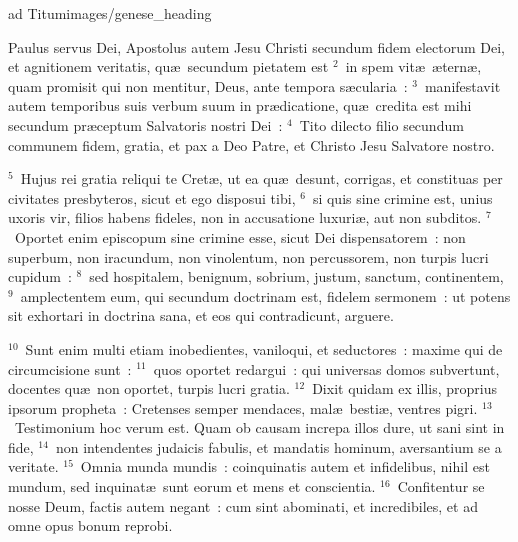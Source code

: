 {ad Titum}{images/genese_heading}


\lettrine[lines=10,image=true,loversize=0.05,lraise=-0.03]{P}{}aulus servus Dei, Apostolus autem Jesu Christi secundum fidem electorum Dei, et agnitionem veritatis, qu\ae\ secundum pietatem est
${}^{2}$~in spem vit\ae\ \ae tern\ae , quam promisit qui non mentitur, Deus, ante tempora s\ae cularia~:
${}^{3}$~manifestavit autem temporibus suis verbum suum in pr\ae dicatione, qu\ae\ credita est mihi secundum pr\ae ceptum Salvatoris nostri Dei~:
${}^{4}$~Tito dilecto filio secundum communem fidem, gratia, et pax a Deo Patre, et Christo Jesu Salvatore nostro.


${}^{5}$~Hujus rei gratia reliqui te Cret\ae , ut ea qu\ae\ desunt, corrigas, et constituas per civitates presbyteros, sicut et ego disposui tibi,
${}^{6}$~si quis sine crimine est, unius uxoris vir, filios habens fideles, non in accusatione luxuri\ae , aut non subditos.
${}^{7}$~Oportet enim episcopum sine crimine esse, sicut Dei dispensatorem~: non superbum, non iracundum, non vinolentum, non percussorem, non turpis lucri cupidum~:
${}^{8}$~sed hospitalem, benignum, sobrium, justum, sanctum, continentem,
${}^{9}$~amplectentem eum, qui secundum doctrinam est, fidelem sermonem~: ut potens sit exhortari in doctrina sana, et eos qui contradicunt, arguere.


${}^{10}$~Sunt enim multi etiam inobedientes, vaniloqui, et seductores~: maxime qui de circumcisione sunt~:
${}^{11}$~quos oportet redargui~: qui universas domos subvertunt, docentes qu\ae\ non oportet, turpis lucri gratia.
${}^{12}$~Dixit quidam ex illis, proprius ipsorum propheta~: Cretenses semper mendaces, mal\ae\ besti\ae , ventres pigri.
${}^{13}$~Testimonium hoc verum est. Quam ob causam increpa illos dure, ut sani sint in fide,
${}^{14}$~non intendentes judaicis fabulis, et mandatis hominum, aversantium se a veritate.
${}^{15}$~Omnia munda mundis~: coinquinatis autem et infidelibus, nihil est mundum, sed inquinat\ae\ sunt eorum et mens et conscientia.
${}^{16}$~Confitentur se nosse Deum, factis autem negant~: cum sint abominati, et incredibiles, et ad omne opus bonum reprobi.

